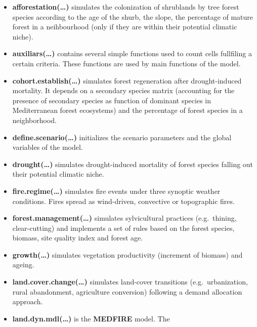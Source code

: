 \documentclass[
]{article}
\providecommand{\tightlist}{%
  \setlength{\itemsep}{0pt}\setlength{\parskip}{0pt}}
\begin{document}
\begin{itemize}
\tightlist
\item
  \textbf{afforestation(\ldots{})} simulates the colonization of
  shrublands by tree forest species according to the age of the shurb,
  the slope, the percentage of mature forest in a neihbourhood (only if
  they are within their potential climatic niche).\\
\item
  \textbf{auxiliars(\ldots{})} contains several simple functions used to
  count cells fullfiling a certain criteria. These functions are used by
  main functions of the model.\\
\item
  \textbf{cohort.establish(\ldots{})} simulates forest regeneration
  after drought-induced mortality. It depends on a secondary species
  matrix (accounting for the presence of secondary species as function
  of dominant species in Mediterranean forest ecosystems) and the
  percentage of forest species in a neighborhood.\\
\item
  \textbf{define.scenario(\ldots{})} initializes the scenario parameters
  and the global variables of the model.\\
\item
  \textbf{drought(\ldots{})} simulates drought-induced mortality of
  forest species falling out their potential climatic niche.\\
\item
  \textbf{fire.regime(\ldots{})} simulates fire events under three
  synoptic weather conditions. Fires spread as wind-driven, convective
  or topographic fires.\\
\item
  \textbf{forest.management(\ldots{})} simulates sylvicultural practices
  (e.g.~thining, clear-cutting) and implements a set of rules based on
  the forest species, biomass, site quality index and forest age.\\
\item
  \textbf{growth(\ldots{})} simulates vegetation productivity (increment
  of biomass) and ageing.\\
\item
  \textbf{land.cover.change(\ldots{})} simulates land-cover transitions
  (e.g.~urbanization, rural abandonment, agriculture conversion)
  following a demand allocation approach.\\
\item
  \textbf{land.dyn.mdl(\ldots{})} is the \textbf{MEDFIRE} model. The

\end{itemize}
\end{document}
